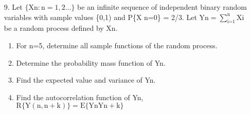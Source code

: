\documentclass[main.tex]{subfiles}
\begin{document}
\begin{enumerate}
\begin{enumerate}
    \end{enumerate}

\item [9.] Let $\{\mathrm{Xn}: \mathrm{n}=1,2 \ldots\}$ be an infinite sequence of independent binary random variables with sample values \{0,1) and P\{X n=0\} = 2/3. Let $\text{Yn}=\sum_{\text{i=1}}^{\text{n}} \text{Xi}$ be a random process defined by Xn.

    \begin{enumerate}
        \item For n=5, determine all sample functions of the random process.
        \item Determine the probability mass function of Yn.
        \item Find the expected value and variance of Yn.
        \item Find the autocorrelation function of Yn, $\mathrm{R}\{\mathrm{Y}(\mathrm{n}, \mathrm{n}+\mathrm{k})\}=\mathrm{E}\{\mathrm{Yn} \mathrm{Yn}+\mathrm{k}\}$
    \end{enumerate}
    
\end{enumerate}
\end{document}

